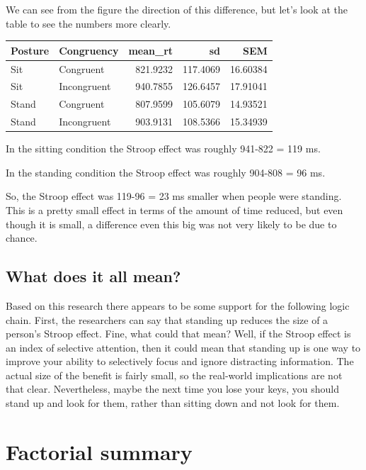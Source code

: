 \documentclass[]{book}
\begin{document}
We can see from the figure the direction of this difference, but let's look at the table to see the numbers more clearly.

\begin{tabular}{l|l|r|r|r}
\hline
Posture & Congruency & mean\_rt & sd & SEM\\
\hline
Sit & Congruent & 821.9232 & 117.4069 & 16.60384\\
\hline
Sit & Incongruent & 940.7855 & 126.6457 & 17.91041\\
\hline
Stand & Congruent & 807.9599 & 105.6079 & 14.93521\\
\hline
Stand & Incongruent & 903.9131 & 108.5366 & 15.34939\\
\hline
\end{tabular}

In the sitting condition the Stroop effect was roughly 941-822 = 119 ms.

In the standing condition the Stroop effect was roughly 904-808 = 96 ms.

So, the Stroop effect was 119-96 = 23 ms smaller when people were standing. This is a pretty small effect in terms of the amount of time reduced, but even though it is small, a difference even this big was not very likely to be due to chance.

\hypertarget{what-does-it-all-mean}{%
\subsection{What does it all mean?}\label{what-does-it-all-mean}}

Based on this research there appears to be some support for the following logic chain. First, the researchers can say that standing up reduces the size of a person's Stroop effect. Fine, what could that mean? Well, if the Stroop effect is an index of selective attention, then it could mean that standing up is one way to improve your ability to selectively focus and ignore distracting information. The actual size of the benefit is fairly small, so the real-world implications are not that clear. Nevertheless, maybe the next time you lose your keys, you should stand up and look for them, rather than sitting down and not look for them.

\hypertarget{factorial-summary}{%
\section{Factorial summary}\label{factorial-summary}}
\end{document}
